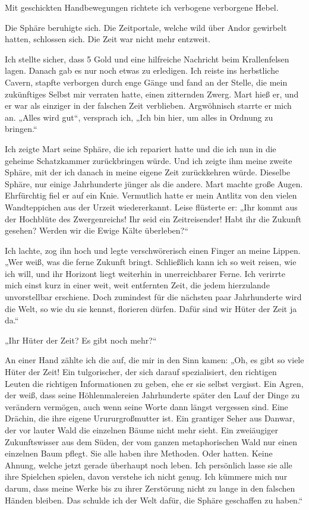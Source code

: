 \documentclass[10pt, a4paper, oneside]{book}
\begin{document}
Mit geschickten Handbewegungen richtete ich verbogene verborgene Hebel.
 
Die Sphäre beruhigte sich. Die Zeitportale, welche wild über Andor gewirbelt hatten, schlossen sich. Die Zeit war nicht mehr entzweit.

Ich stellte sicher, dass 5 Gold und eine hilfreiche Nachricht beim Krallenfelsen lagen. Danach gab es nur noch etwas zu erledigen. Ich reiste ins herbstliche Cavern, stapfte verborgen durch enge Gänge und fand an der Stelle, die mein zukünftiges Selbst mir verraten hatte, einen zitternden Zwerg. Mart hieß er, und er war als einziger in der falschen Zeit verblieben. Argwöhnisch starrte er mich an. „Alles wird gut“, versprach ich, „Ich bin hier, um alles in Ordnung zu bringen.“ 

Ich zeigte Mart seine Sphäre, die ich repariert hatte und die ich nun in die geheime Schatzkammer zurückbringen würde. Und ich zeigte ihm meine zweite Sphäre, mit der ich danach in meine eigene Zeit zurückkehren würde. Dieselbe Sphäre, nur einige Jahrhunderte jünger als die andere. Mart machte große Augen. Ehrfürchtig fiel er auf ein Knie. Vermutlich hatte er mein Antlitz von den vielen Wandteppichen aus der Urzeit wiedererkannt. Leise flüsterte er: „Ihr kommt aus der Hochblüte des Zwergenreichs! Ihr seid ein Zeitreisender! Habt ihr die Zukunft gesehen? Werden wir die Ewige Kälte überleben?“ 

Ich lachte, zog ihn hoch und legte verschwörerisch einen Finger an meine Lippen. „Wer weiß, was die ferne Zukunft bringt. Schließlich kann ich so weit reisen, wie ich will, und ihr Horizont liegt weiterhin in unerreichbarer Ferne. Ich verirrte mich einst kurz in einer weit, weit entfernten Zeit, die jedem hierzulande unvorstellbar erschiene. Doch zumindest für die nächsten paar Jahrhunderte wird die Welt, so wie du sie kennst, florieren dürfen. Dafür sind wir Hüter der Zeit ja da.“ 

„Ihr Hüter der Zeit? Es gibt noch mehr?“

An einer Hand zählte ich die auf, die mir in den Sinn kamen: „Oh, es gibt so viele Hüter der Zeit! Ein tulgorischer, der sich darauf spezialisiert, den richtigen Leuten die richtigen Informationen zu geben, ehe er sie selbst vergisst. Ein Agren, der weiß, dass seine Höhlenmalereien Jahrhunderte später den Lauf der Dinge zu verändern vermögen, auch wenn seine Worte dann längst vergessen sind. Eine Drächin, die ihre eigene Urururgroßmutter ist. Ein grantiger Seher aus Danwar, der vor lauter Wald die einzelnen Bäume nicht mehr sieht. Ein zweiäugiger Zukunftswisser aus dem Süden, der vom ganzen metaphorischen Wald nur einen einzelnen Baum pflegt. Sie alle haben ihre Methoden. Oder hatten. Keine Ahnung, welche jetzt gerade überhaupt noch leben. Ich persönlich lasse sie alle ihre Spielchen spielen, davon verstehe ich nicht genug. Ich kümmere mich nur darum, dass meine Werke bis zu ihrer Zerstörung nicht zu lange in den falschen Händen bleiben. Das schulde ich der Welt dafür, die Sphäre geschaffen zu haben.“ 
\end{document}
